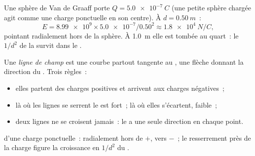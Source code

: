 \begin{example}\label{ex:g11:electric-gravitational-fields:sphere}
Une sphère de Van de Graaff porte $Q = \qty{+5.0e-7}{C}$ (une petite
sphère chargée agit comme une charge ponctuelle en son centre). À
$d = \qty{0.50}{m}$~:
\[
E = \num{8.99e9} \times \num{5.0e-7} / 0.50^2 \approx \qty{1.8e4}{N/C},
\]
pointant radialement hors de la sphère. À \qty{1.0}{m} elle est tombée
au quart~: le $1/d^2$ de la  survit
dans le .
\end{example}

\begin{definition}\label{def:g11:electric-gravitational-fields:lines}
Une \emph{ligne de champ} est une courbe partout
tangente au , une flèche donnant
la direction du . Trois règles~:
\begin{itemize}
  \item elles partent des charges positives et arrivent aux charges
        négatives~;
  \item là où les lignes se serrent le
         est fort~; là où elles
        s'écartent, faible~;
  \item deux lignes ne se croisent jamais~: le
         a une seule direction en
        chaque point.
\end{itemize}
\end{definition}

\begin{omfigure}
\qquad\qquad
{}

{\small {} d'une charge
ponctuelle~: radialement hors de $+$, vers $-$~; le resserrement près
de la charge figure la croissance en $1/d^2$ du
.}
\end{omfigure}

